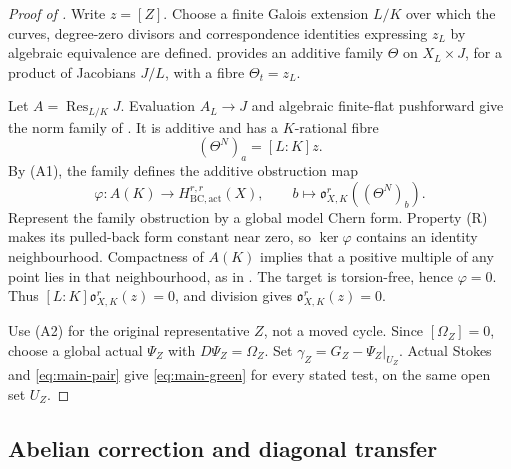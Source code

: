 \documentclass[11pt]{article}
\theoremstyle{definition}
\theoremstyle{remark}
\numberwithin{equation}{section}
\newcommand{\Ob}{\mathfrak o}
\newcommand{\BC}{\mathrm{BC,act}}
\begin{document}
\begin{proof}[Proof of ]
Write $z=[Z]$. Choose a finite Galois extension $L/K$ over which the curves, degree-zero divisors and correspondence identities expressing $z_L$ by algebraic equivalence are defined.  provides an additive family $\Theta$ on $X_L\times J$, for a product of Jacobians $J/L$, with a fibre $\Theta_t=z_L$.

Let $A=\operatorname{Res}_{L/K}J$. Evaluation $A_L\to J$ and algebraic finite-flat pushforward give the norm family of . It is additive and has a $K$-rational fibre
\[
 (\Theta^N)_a=[L:K]z.
\]
By (A1), the family defines the additive obstruction map
\[
 \varphi:A(K)\longrightarrow H^{r,r}_{\BC}(X),
 \qquad b\longmapsto\Ob^r_{X,K}((\Theta^N)_b).
\]
Represent the family obstruction by a global model Chern form. Property (R) makes its pulled-back form constant near zero, so $\ker\varphi$ contains an identity neighbourhood. Compactness of $A(K)$ implies that a positive multiple of any point lies in that neighbourhood, as in . The target is torsion-free, hence $\varphi=0$. Thus $[L:K]\Ob^r_{X,K}(z)=0$, and division gives $\Ob^r_{X,K}(z)=0$.

Use (A2) for the original representative $Z$, not a moved cycle. Since $[\Omega_Z]=0$, choose a global actual $\Psi_Z$ with $D\Psi_Z=\Omega_Z$. Set $\gamma_Z=G_Z-\Psi_Z|_{U_Z}$. Actual Stokes and \eqref{eq:main-pair} give \eqref{eq:main-green} for every stated test, on the same open set $U_Z$.
\end{proof}

\subsection{Abelian correction and diagonal transfer}\label{sec:conditional-abelian-proof}
\end{document}
